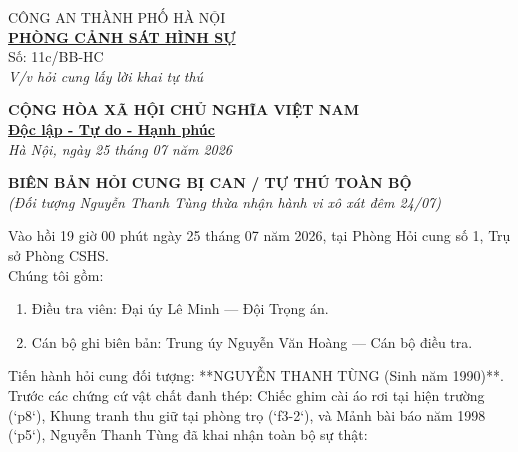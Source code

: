 \documentclass[12pt,a4paper]{article}
\begin{document}
\noindent
\begin{minipage}[t]{0.45\textwidth}
    \begin{center}
        \small
        CÔNG AN THÀNH PHỐ HÀ NỘI\\
        \textbf{\underline{PHÒNG CẢNH SÁT HÌNH SỰ}}\\[0.1cm]
        Số: 11c/BB-HC\\
        \textit{V/v hỏi cung lấy lời khai tự thú}
    \end{center}
\end{minipage}
\hfill
\begin{minipage}[t]{0.52\textwidth}
    \begin{center}
        \small
        \textbf{CỘNG HÒA XÃ HỘI CHỦ NGHĨA VIỆT NAM}\\
        \textbf{\underline{Độc lập - Tự do - Hạnh phúc}}\\[0.1cm]
        \textit{Hà Nội, ngày 25 tháng 07 năm 2026}
    \end{center}
\end{minipage}

\vspace{0.6cm}

\begin{center}
    \textbf{\large BIÊN BẢN HỎI CUNG BỊ CAN / TỰ THÚ TOÀN BỘ}\\
    \textit{(Đối tượng Nguyễn Thanh Tùng thừa nhận hành vi xô xát đêm 24/07)}
\end{center}

\vspace{0.3cm}

\noindent Vào hồi 19 giờ 00 phút ngày 25 tháng 07 năm 2026, tại Phòng Hỏi cung số 1, Trụ sở Phòng CSHS.\\
Chúng tôi gồm:
\begin{enumerate}[label=\arabic*., leftmargin=1.5cm]
    \item Điều tra viên: Đại úy Lê Minh — Đội Trọng án.
    \item Cán bộ ghi biên bản: Trung úy Nguyễn Văn Hoàng — Cán bộ điều tra.
\end{enumerate}

\noindent Tiến hành hỏi cung đối tượng: **NGUYỄN THANH TÙNG (Sinh năm 1990)**.\\
Trước các chứng cứ vật chất đanh thép: Chiếc ghim cài áo rơi tại hiện trường (`p8`), Khung tranh thu giữ tại phòng trọ (`f3-2`), và Mảnh bài báo năm 1998 (`p5`), Nguyễn Thanh Tùng đã khai nhận toàn bộ sự thật:
\end{document}

